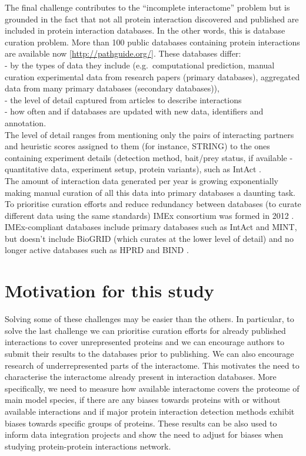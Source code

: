 \documentclass[12pt,]{report}
\begin{document}
The final challenge contributes to the ``incomplete interactome''
problem but is grounded in the fact that not all protein interaction
discovered and published are included in protein interaction databases.
In the other words, this is database curation problem. More than 100
public databases containing protein interactions are available now
{[}\url{http://pathguide.org/}{]}. These databases differ:\\
- by the types of data they include (e.g.~computational prediction,
manual curation experimental data from research papers (primary
databases), aggregated data from many primary databases (secondary
databases)),\\
- the level of detail captured from articles to describe interactions\\
- how often and if databases are updated with new data, identifiers and
annotation.\\
The level of detail ranges from mentioning only the pairs of interacting
partners and heuristic scores assigned to them (for instance, STRING) to
the ones containing experiment details (detection method, bait/prey
status, if available - quantitative data, experiment setup, protein
variants), such as IntAct \citep{Orchard:2014aa}.\\
The amount of interaction data generated per year is growing
exponentially making manual curation of all this data into primary
databases a daunting task. To prioritise curation efforts and reduce
redundancy between databases (to curate different data using the same
standards) IMEx consortium was formed in 2012 \citep{Orchard:2012aa}.
IMEx-compliant databases include primary databases such as IntAct and
MINT, but doesn't include BioGRID (which curates at the lower level of
detail) and no longer active databases such as HPRD \citep{Peri:2004aa}
and BIND \citep{Isserlin:2011aa}.

\chapter{Motivation for this study}\label{motivation-for-this-study}

Solving some of these challenges may be easier than the others. In
particular, to solve the last challenge we can prioritise curation
efforts for already published interactions to cover unrepresented
proteins and we can encourage authors to submit their results to the
databases prior to publishing. We can also encourage research of
underrepresented parts of the interactome. This motivates the need to
characterise the interactome already present in interaction databases.
More specifically, we need to measure how available interactome covers
the proteome of main model species, if there are any biases towards
proteins with or without available interactions and if major protein
interaction detection methods exhibit biases towards specific groups of
proteins. These results can be also used to inform data integration
projects and show the need to adjust for biases when studying
protein-protein interactions network.
\end{document}
